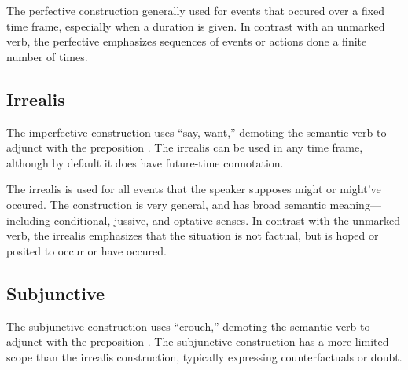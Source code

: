The perfective construction generally used for events that occured over a fixed time frame, especially when a duration is given. In contrast with an unmarked verb, the perfective emphasizes sequences of events or actions done a finite number of times.

\subsection{Irrealis}
The imperfective construction uses  “say, want,” demoting the semantic verb to adjunct with the preposition . The irrealis can be used in any time frame, although by default it does have future-time connotation.

The irrealis is used for all events that the speaker supposes might or might've occured. The construction is very general, and has broad semantic meaning---including conditional, jussive, and optative senses. In contrast with the unmarked verb, the irrealis emphasizes that the situation is not factual, but is hoped or posited to occur or have occured.

\subsection{Subjunctive}
The subjunctive construction uses  “crouch,” demoting the semantic verb to adjunct with the preposition . The subjunctive construction has a more limited scope than the  irrealis construction, typically expressing counterfactuals or doubt.
